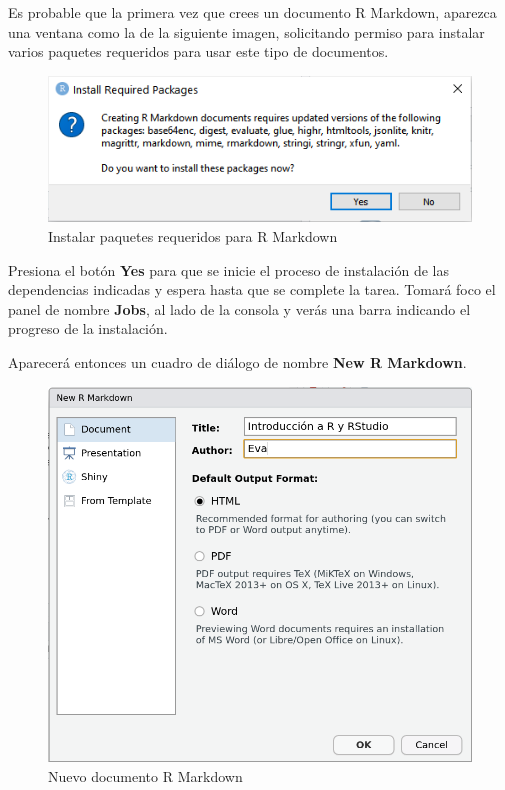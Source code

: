 \documentclass[
  title=normal,
  notoc,
  bib=normal]{mnye}
\begin{document}
\begin{infobox}

Es probable que la primera vez que crees un documento R Markdown, aparezca una ventana como la de la siguiente imagen, solicitando permiso para instalar varios paquetes requeridos para usar este tipo de documentos.

\begin{figure}

{\centering \includegraphics[width=0.85\linewidth]{images/rmarkdown-required} 

}

\caption{Instalar paquetes requeridos para R Markdown}\label{fig:unnamed-chunk-10}
\end{figure}

Presiona el botón \textbf{Yes} para que se inicie el proceso de instalación de las dependencias indicadas y espera hasta que se complete la tarea. Tomará foco el panel de nombre \textbf{Jobs}, al lado de la consola y verás una barra indicando el progreso de la instalación.

\end{infobox}

Aparecerá entonces un cuadro de diálogo de nombre \textbf{New R Markdown}.

\begin{figure}

{\centering \includegraphics[width=1\linewidth]{images/new-r-markdown} 

}

\caption{Nuevo documento R Markdown}\label{fig:unnamed-chunk-11}
\end{figure}
\end{document}
